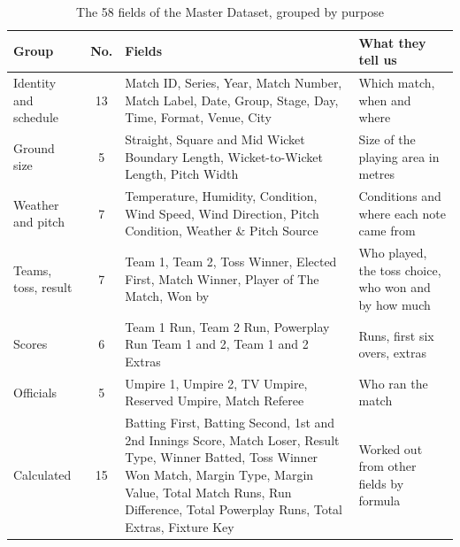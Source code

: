 \begin{table}[!t]
\caption{The 58 fields of the Master Dataset, grouped by purpose}
\label{tab:fields}
\centering
\footnotesize
\renewcommand{\arraystretch}{1.08}
\begin{tabular}{@{}p{}c p{}p{}@{}}
\toprule
\textbf{Group} & \textbf{No.} & \textbf{Fields} & \textbf{What they tell us} \\
\midrule
Identity and schedule & 13 & Match ID, Series, Year, Match Number, Match Label, Date, Group, Stage, Day, Time, Format, Venue, City & Which match, when and where \\
Ground size & 5 & Straight, Square and Mid Wicket Boundary Length, Wicket-to-Wicket Length, Pitch Width & Size of the playing area in metres \\
Weather and pitch & 7 & Temperature, Humidity, Condition, Wind Speed, Wind Direction, Pitch Condition, Weather \& Pitch Source & Conditions and where each note came from \\
Teams, toss, result & 7 & Team 1, Team 2, Toss Winner, Elected First, Match Winner, Player of The Match, Won by & Who played, the toss choice, who won and by how much \\
Scores & 6 & Team 1 Run, Team 2 Run, Powerplay Run Team 1 and 2, Team 1 and 2 Extras & Runs, first six overs, extras \\
Officials & 5 & Umpire 1, Umpire 2, TV Umpire, Reserved Umpire, Match Referee & Who ran the match \\
Calculated & 15 & Batting First, Batting Second, 1st and 2nd Innings Score, Match Loser, Result Type, Winner Batted, Toss Winner Won Match, Margin Type, Margin Value, Total Match Runs, Run Difference, Total Powerplay Runs, Total Extras, Fixture Key & Worked out from other fields by formula \\
\bottomrule
\end{tabular}
\end{table}
